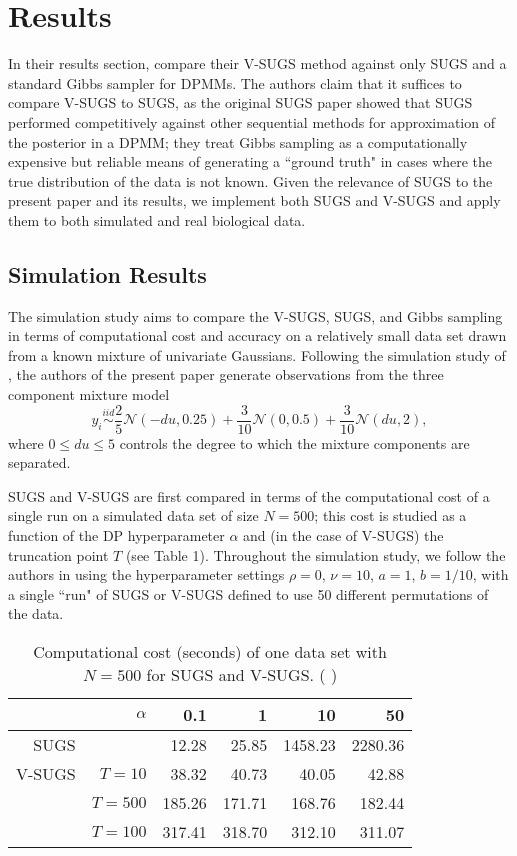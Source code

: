 \documentclass{uwstat572}
\newcommand{\vmcomment}[1]{({\color{blue}{VM's comment:}} \textbf{\color{blue}{#1}})}
\begin{document}
\section{Results}

In their results section, \cite{zhang} compare their V-SUGS method against only SUGS and a standard Gibbs sampler for DPMMs. The authors claim that it suffices to compare V-SUGS to SUGS, as the original SUGS paper showed that SUGS performed competitively against other sequential methods for approximation of the posterior in a DPMM; they treat Gibbs sampling as a computationally expensive but reliable means of generating a ``ground truth" in cases where the true distribution of the data is not known. Given the relevance of SUGS to the present paper and its results, we implement both SUGS and V-SUGS and apply them to both simulated and real biological data. 

\subsection{Simulation Results}

The simulation study aims to compare the V-SUGS, SUGS, and Gibbs sampling in terms of computational cost and accuracy on a relatively small data set drawn from a known mixture of univariate Gaussians. Following the simulation study of \cite{wang}, the authors of the present paper generate observations from the three component mixture model
$$ y_i \overset{iid}\sim \frac{2}{5}\mathcal{N}(-du,0.25)+ \frac{3}{10}\mathcal{N}(0,0.5)+ \frac{3}{10}\mathcal{N}(du,2),$$
where $0 \leq du \leq 5$ controls the degree to which the mixture components are separated.

SUGS and V-SUGS are first compared in terms of the computational cost of a single run on a simulated data set of size $N = 500$; this cost is studied as a function of the DP hyperparameter $\alpha$ and (in the case of V-SUGS) the truncation point $T$ (see Table 1). Throughout the simulation study, we follow the authors in using the hyperparameter settings $\rho = 0$, $\nu = 10$, $a =1$, $b = 1/10$, with a single ``run" of SUGS or V-SUGS defined to use 50 different permutations of the data. 

\begin{table}[ht]
\centering
\begin{tabular}{rrrrrr}
  \hline \hline
 & $\alpha$ & 0.1 & 1 & 10 & 50 \\ 
  \hline
SUGS & & 12.28 & 25.85 & 1458.23 & 2280.36 \\ 
  V-SUGS & $T=10$& 38.32 & 40.73 & 40.05 & 42.88 \\ 
   & $T=500$& 185.26 & 171.71 & 168.76 & 182.44 \\ 
   & $T=100$& 317.41 &  318.70 & 312.10 & 311.07 \\ 
   \hline
\end{tabular}
\caption{\small Computational cost (seconds) of one data set with $N=500$ for SUGS and V-SUGS.
\vmcomment{Remind the reader what $T$ is in the caption. Generally, it is better if all captions are self-contained and don't require going to the main text for explanations. Also, do you really need 2 digits after the decimal?}}
\end{table}
\end{document}
